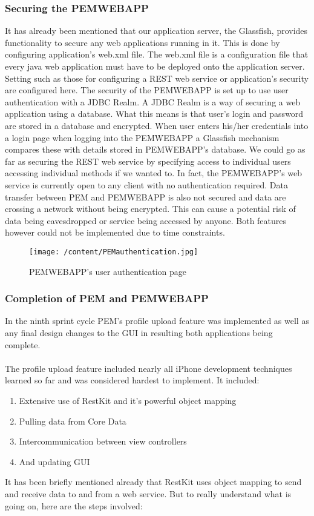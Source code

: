 \documentclass[12pt, a4paper]{report}   %
\begin{document}
\begin{enumerate}
\subsubsection{Securing the PEMWEBAPP}
It has already been mentioned that our application server, the Glassfish, provides functionality to secure any web applications running in it. This is done by configuring application's web.xml file. The web.xml file is a configuration file that every java web application must have to be deployed onto the application server. Setting such as those for configuring a REST web service or application's security are configured here. The security of the PEMWEBAPP is set up to use user authentication with a JDBC Realm. A JDBC Realm is a way of securing a web application using a database. What this means is that user's login and password are stored in a database and encrypted. When user enters his/her credentials into a login page when logging into the PEMWEBAPP a Glassfish mechanism compares these with details stored in PEMWEBAPP's database.
We could go as far as securing the REST web service by specifying access to individual users accessing individual methods if we wanted to. In fact, the PEMWEBAPP's web service is currently open to any client with no authentication required. Data transfer between PEM and PEMWEBAPP is also not secured and data are crossing a network without being encrypted. This can cause a potential risk of data being eavesdropped or service being accessed by anyone. Both features however could not be implemented due to time constraints.


\begin{figure}[H]
  \centering
	\texttt{[image: /content/PEMauthentication.jpg]}
	  \caption{PEMWEBAPP's user authentication page}
\end{figure}


\subsubsection{Completion of PEM and PEMWEBAPP}
In the ninth sprint cycle PEM's profile upload feature was implemented as well as any final design changes to the GUI in resulting both applications being complete.\\ \\
The profile upload feature included nearly all iPhone development techniques learned so far and was considered hardest to implement. It included:\\
\begin{enumerate}
	\item Extensive use of RestKit and it's powerful object mapping
	\item Pulling data from Core Data
	\item Intercommunication between view controllers
	\item And updating GUI\\
\end{enumerate}
It has been briefly mentioned already that RestKit uses object mapping to send and receive data to and from a web service. But to really understand what is going on, here are the steps involved:


\end{enumerate}
\end{document}
